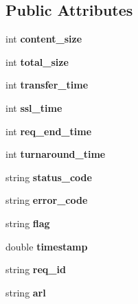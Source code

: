 \subsection*{Public Attributes}
\begin{DoxyCompactItemize}
\item 
\mbox{\label{struct_tx_a1cbd03a7ec5a0cc651666d0795e0548e}} 
int {\bfseries content\+\_\+size}
\item 
\mbox{\label{struct_tx_a0181e88dbe6a9f42567e3153413deba0}} 
int {\bfseries total\+\_\+size}
\item 
\mbox{\label{struct_tx_a931b7d10a8b7f8da31339a6a55b28be9}} 
int {\bfseries transfer\+\_\+time}
\item 
\mbox{\label{struct_tx_aa1405c060e20c2c1a3a485349db3d735}} 
int {\bfseries ssl\+\_\+time}
\item 
\mbox{\label{struct_tx_ad9d8c7ebf3aa6396d734376cc0d913a5}} 
int {\bfseries req\+\_\+end\+\_\+time}
\item 
\mbox{\label{struct_tx_afe8c130ad6ffa633708cec477a3dab47}} 
int {\bfseries turnaround\+\_\+time}
\item 
\mbox{\label{struct_tx_a290fe930cd644d9cfd52ff61191c5f4a}} 
string {\bfseries status\+\_\+code}
\item 
\mbox{\label{struct_tx_add727365a75bc29e49a9247d981fc735}} 
string {\bfseries error\+\_\+code}
\item 
\mbox{\label{struct_tx_a5bc03d1d0fb33044bda1d8387feca8b8}} 
string {\bfseries flag}
\item 
\mbox{\label{struct_tx_ac99bd5b80964100fc5614f9ff8491120}} 
double {\bfseries timestamp}
\item 
\mbox{\label{struct_tx_a2792502a06d590ee17cab0ad2c0f06e9}} 
string {\bfseries req\+\_\+id}
\item 
\mbox{\label{struct_tx_a147834eb940da2b7eaae1fd89114dfc5}} 
string {\bfseries arl}

\end{DoxyCompactItemize}
